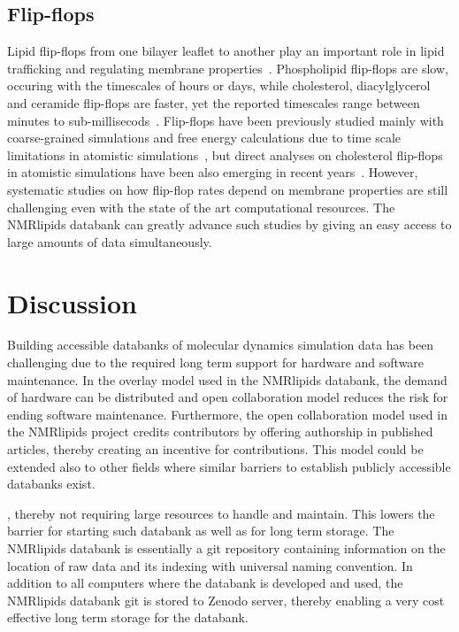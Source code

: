 \documentclass[fleqn,10pt]{wlscirep}
\begin{document}
\subsection{Flip-flops}
Lipid flip-flops from one bilayer leaflet to another play an important role in lipid trafficking and regulating membrane properties~\cite{vanmeer08}. Phospholipid flip-flops are slow, occuring with the timescales of hours or days, while cholesterol, diacylglycerol and ceramide flip-flops are faster, yet the reported timescales range between minutes to sub-millisecods~\cite{vanmeer08,steck12,parisio16,gu19}. Flip-flops have been previously studied mainly with coarse-grained simulations and free energy calculations due to time scale limitations in atomistic simulations~\cite{parisio16}, but direct analyses on cholesterol flip-flops in atomistic simulations have been also emerging in recent years~\cite{gu19,javanainen18,baral20}. However, systematic studies on how flip-flop rates depend on membrane properties are still challenging even with the state of the art computational resources. The NMRlipids databank can greatly advance such studies by giving an easy access to large amounts of data simultaneously.


\section{Discussion}


Building accessible databanks of molecular dynamics simulation data has been challenging due to the required long term support for hardware and software maintenance. In the overlay model used in the NMRlipids databank, the demand of hardware can be distributed and open collaboration model reduces the risk for ending software maintenance. Furthermore, the open collaboration model used in the NMRlipids project credits contributors by offering authorship in published articles, thereby creating an incentive for contributions. This model could be extended also to other fields where similar barriers to establish publicly accessible databanks exist. 


, thereby not requiring large resources to handle and maintain. This lowers the barrier for starting such databank as well as for long term storage. The NMRlipids databank is essentially a git repository containing information on the location of raw data and its indexing with universal naming convention. In addition to all computers where the databank is developed and used, the NMRlipids databank git is stored to Zenodo server, thereby enabling a very cost effective long term storage for the databank. 
\end{document}
